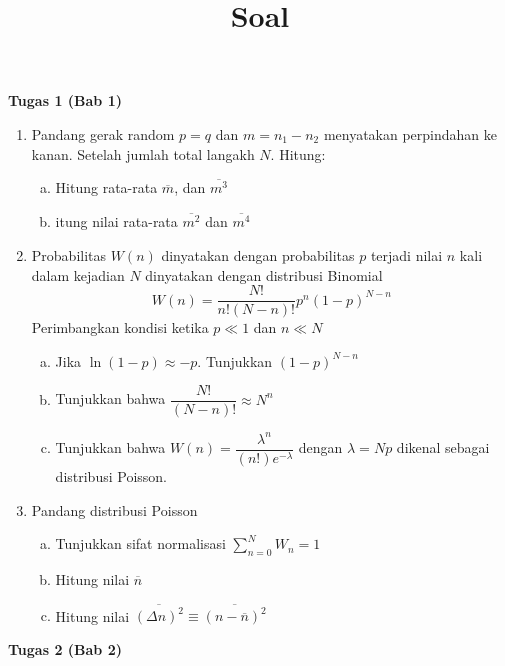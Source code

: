 \title{\centering\Large{{\textbf{Soal}}}}

\textbf{Tugas 1 (Bab 1)}
    \begin{enumerate}
        \item Pandang gerak random $p=q$ dan $m=n_1-n_2$ menyatakan perpindahan ke kanan. Setelah jumlah total langakh $N$. Hitung:
        \begin{enumerate}[(a)]
            \item Hitung rata-rata $\overline{m}$, dan $\overline{m^3}$
            \item itung nilai rata-rata $\overline{m^2}$ dan $\overline{m^4}$
        \end{enumerate}
        \item Probabilitas $W(n)$ dinyatakan dengan probabilitas $p$ terjadi nilai $n$ kali dalam kejadian $N$ dinyatakan dengan distribusi Binomial
        \begin{equation*}
            W(n)=\dfrac{N!}{n!(N-n)!}p^n(1-p)^{N-n}
        \end{equation*}
        Perimbangkan kondisi ketika $p\ll 1$ dan $n\ll N$
        \begin{enumerate}[(a)]
            \item Jika $\ln(1-p)\approx-p$. Tunjukkan $(1-p)^{N-n}$
            \item Tunjukkan bahwa $\dfrac{N!}{(N-n)!}\approx N^n$
            \item Tunjukkan bahwa $W(n)=\dfrac{\lambda^n}{(n!)e^{-\lambda}}$ dengan $\lambda=Np$ dikenal sebagai distribusi Poisson.
        \end{enumerate}
        \item Pandang distribusi Poisson
        \begin{enumerate}[(a)]
            \item Tunjukkan sifat normalisasi $\sum_{n=0}^N W_n=1$
            \item Hitung nilai $\overline{n}$
            \item Hitung nilai $\overline{(\Delta n)^2}\equiv\overline{(n-\overline{n})^2}$
        \end{enumerate}
    \end{enumerate}
\textbf{Tugas 2 (Bab 2)}
